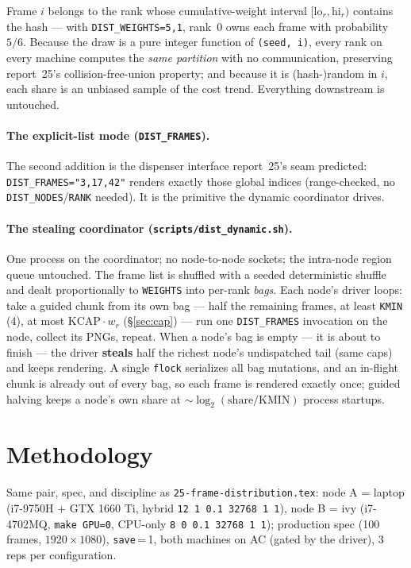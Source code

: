 \documentclass[
	english,
	letterpaper, oneside
]{article}
\begin{document}
Frame $i$ belongs to the rank whose cumulative-weight interval
$[\mathrm{lo}_r, \mathrm{hi}_r)$ contains the hash --- with
\texttt{DIST\_WEIGHTS=5,1}, rank~0 owns each frame with probability $5/6$.
Because the draw is a pure integer function of \texttt{(seed, i)}, every
rank on every machine computes the \emph{same partition} with no
communication, preserving report~25's collision-free-union property; and
because it is (hash-)random in $i$, each share is an unbiased sample of the
cost trend. Everything downstream is untouched.

\paragraph{The explicit-list mode (\texttt{DIST\_FRAMES}).} The second
addition is the dispenser interface report~25's seam predicted:
\texttt{DIST\_FRAMES="3,17,42"} renders exactly those global indices
(range-checked, no \texttt{DIST\_NODES}/\texttt{RANK} needed). It is the
primitive the dynamic coordinator drives.

\paragraph{The stealing coordinator (\texttt{scripts/dist\_dynamic.sh}).}
One process on the coordinator; no node-to-node sockets; the intra-node
region queue untouched. The frame list is shuffled with a seeded
deterministic shuffle and dealt proportionally to \texttt{WEIGHTS} into
per-rank \emph{bags}. Each node's driver loops: take a guided chunk from its
own bag --- half the remaining frames, at least \texttt{KMIN} (4), at most
$\mathrm{KCAP}\cdot w_r$ (\S\ref{sec:cap}) --- run one
\texttt{DIST\_FRAMES} invocation on the node, collect its PNGs, repeat.
When a node's bag is empty --- it is about to finish --- the driver
\textbf{steals} half the richest node's undispatched tail (same caps) and
keeps rendering. A single \texttt{flock} serializes all bag mutations, and
an in-flight chunk is already out of every bag, so each frame is rendered
exactly once; guided halving keeps a node's own share at
$\sim\log_2(\mathrm{share}/\mathrm{KMIN})$ process startups.

\section{Methodology}
\label{sec:method}

Same pair, spec, and discipline as \texttt{25-frame-distribution.tex}: node
A = laptop (i7-9750H + GTX 1660 Ti, hybrid \texttt{12 1 0.1 32768 1 1}),
node B = ivy (i7-4702MQ, \texttt{make GPU=0}, CPU-only
\texttt{8 0 0.1 32768 1 1}); production spec (100 frames,
$1920\times1080$), \texttt{save}\,=\,1, both machines on AC (gated by the
driver), 3 reps per configuration.
\end{document}
